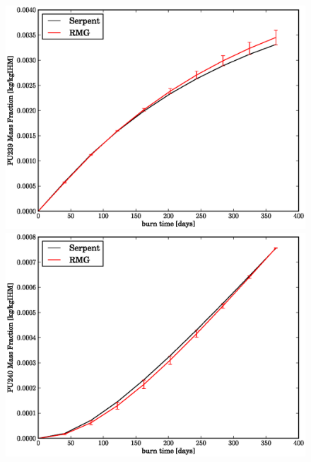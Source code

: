 \begin{figure}[htbp]
\begin{center}
\includegraphics[scale=0.3]{multigroup_method/figs/benchmark/PU239_Mass_Fraction_.eps}
\includegraphics[scale=0.3]{multigroup_method/figs/benchmark/PU240_Mass_Fraction_.eps}
\end{center}
\end{figure}
